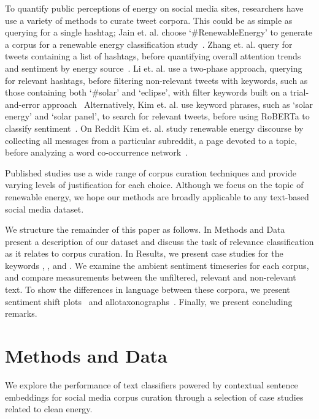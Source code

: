To quantify public perceptions of energy on social media sites,
researchers have use a variety of methods to curate tweet corpora. 
This could be as simple as querying for a single hashtag; Jain et. al. choose `\#RenewableEnergy'  to generate a corpus for a renewable energy classification study~\cite{jain2019sentiment}.
Zhang et. al. query for tweets containing a list of hashtags,
before quantifying overall attention trends and sentiment by energy source~\cite{zhang2022perceptions}.
Li et. al. use a two-phase approach, querying for relevant hashtags, before filtering non-relevant tweets with keywords, such as those containing both `\#solar' and `eclipse', with filter keywords built on a trial-and-error approach~\cite{li2019beyondBigData}
Alternatively, Kim et. al. use keyword phrases,
such as `solar energy' and `solar panel', to search for relevant tweets,
before using RoBERTa to classify sentiment~\cite{kim2021public}.
On Reddit Kim et. al. study renewable energy discourse by collecting all messages from a particular subreddit,
a page devoted to a topic,
before analyzing a word co-occurrence network~\cite{kim2020exploring}.

Published studies use a wide range of corpus curation techniques
and provide varying levels of justification for each choice.
Although we focus on the topic of renewable energy, we hope our methods are broadly applicable
to any text-based social media dataset.

We structure the remainder of this paper as follows. In Methods and Data present a description of our dataset and discuss the task of relevance classification as it relates to corpus curation. In Results, we present case studies for the keywords , , and . We examine the ambient sentiment timeseries for each corpus, and compare measurements between the unfiltered, relevant and non-relevant text. To show the differences in language between these corpora, we present sentiment shift plots~\cite{gallagher2021generalized} and allotaxonographs~\cite{dodds2020allotaxonometry}. Finally, we present concluding remarks.

\section{Methods and Data}
\label{sec:corpusCreation.methods}



We explore the performance of text classifiers
powered by contextual sentence embeddings
for social media corpus curation
through a selection of case studies related to clean energy. 




